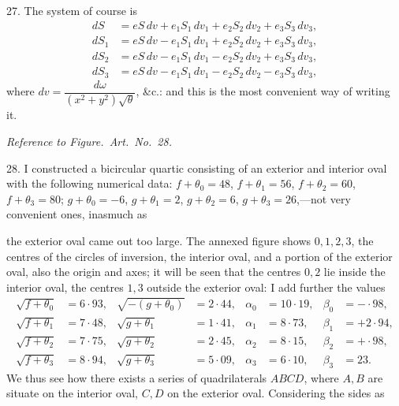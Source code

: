 \documentclass[11pt,a4paper]{article}
\begin{document}
\medskip

27. The system of course is
\begin{align*}
dS &= eS\,dv + e_{1}S_{1}\,dv_{1} + e_{2}S_{2}\,dv_{2} + e_{3}S_{3}\,dv_{3},\\
dS_{1} &= eS\,dv - e_{1}S_{1}\,dv_{1} + e_{2}S_{2}\,dv_{2} + e_{3}S_{3}\,dv_{3},\\
dS_{2} &= eS\,dv - e_{1}S_{1}\,dv_{1} - e_{2}S_{2}\,dv_{2} + e_{3}S_{3}\,dv_{3},\\
dS_{3} &= eS\,dv - e_{1}S_{1}\,dv_{1} - e_{2}S_{2}\,dv_{2} - e_{3}S_{3}\,dv_{3},
\end{align*}
where $dv = \dfrac{d\omega}{(x^{2} + y^{2})\sqrt{\theta}}$, \&c.: and this is the most convenient way of writing it.

\bigskip

\begin{center}
\emph{Reference to Figure.\ Art.\ No.\ 28.}
\end{center}

\medskip

28. I constructed a bicircular quartic consisting of an exterior and interior oval with the following numerical data: $f + \theta_{0} = 48$, $f + \theta_{1} = 56$, $f + \theta_{2} = 60$, $f + \theta_{3} = 80$; $g + \theta_{0} = -6$, $g + \theta_{1} = 2$, $g + \theta_{2} = 6$, $g + \theta_{3} = 26$,---not very convenient ones, inasmuch as

\newpage


\noindent the exterior oval came out too large. The annexed figure shows $0, 1, 2, 3$, the centres of the circles of inversion, the interior oval, and a portion of the exterior oval, also the origin and axes; it will be seen that the centres $0, 2$ lie inside the interior oval, the centres $1, 3$ outside the exterior oval: I add further the values
\begin{align*}
\sqrt{f + \theta_{0}} &= 6\cdot 93, & \sqrt{-(g + \theta_{0})} &= 2\cdot 44, & \alpha_{0} &= 10\cdot 19, & \beta_{0} &= -\cdot 98,\\
\sqrt{f + \theta_{1}} &= 7\cdot 48, & \sqrt{g + \theta_{1}} &= 1\cdot 41, & \alpha_{1} &= 8\cdot 73, & \beta_{1} &= +2\cdot 94,\\
\sqrt{f + \theta_{2}} &= 7\cdot 75, & \sqrt{g + \theta_{2}} &= 2\cdot 45, & \alpha_{2} &= 8\cdot 15, & \beta_{2} &= +\cdot 98,\\
\sqrt{f + \theta_{3}} &= 8\cdot 94, & \sqrt{g + \theta_{3}} &= 5\cdot 09, & \alpha_{3} &= 6\cdot 10, & \beta_{3} &= 23.
\end{align*}
We thus see how there exists a series of quadrilaterals $ABCD$, where $A, B$ are situate on the interior oval, $C, D$ on the exterior oval. Considering the sides as
\end{document}

